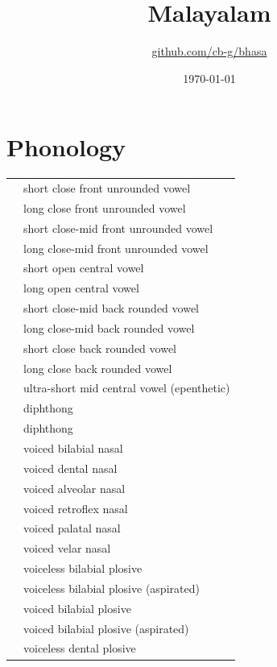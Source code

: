 \documentclass{article}
\title{Malayalam\\\ipa{[m5l5ja:\:l5m]}}
\author{\href{https://github.com/cb-g/bhasa}{github.com/cb-g/bhasa}}
\date{\today}
\begin{document}
\pagecolor{custom_bg}\color{custom_fg}
\maketitle\thispagestyle{empty}

\newpage\setcounter{page}{1}\section{Phonology}

\begin{xltabular}{\textwidth}{lL}
   & short close front unrounded vowel \\
   & long close front unrounded vowel \\
   & short close-mid front unrounded vowel \\
   & long close-mid front unrounded vowel \\
   & short open central vowel \\
   & long open central vowel \\
   & short close-mid back rounded vowel \\
   & long close-mid back rounded vowel \\
   & short close back rounded vowel \\
   & long close back rounded vowel \\
   & ultra-short mid central vowel (epenthetic) \\
   & diphthong \\
   & diphthong \\
   & voiced bilabial nasal \\
   & voiced dental nasal \\
   & voiced alveolar nasal \\
   & voiced retroflex nasal \\
   & voiced palatal nasal \\
   & voiced velar nasal \\
   & voiceless bilabial plosive \\
   & voiceless bilabial plosive (aspirated) \\
   & voiced bilabial plosive \\
   & voiced bilabial plosive (aspirated) \\
   & voiceless dental plosive \\

\end{xltabular}
\end{document}
